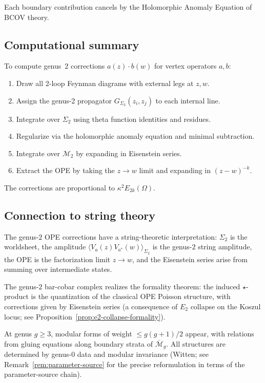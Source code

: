 Each boundary contribution cancels by the Holomorphic Anomaly Equation of BCOV theory.

\subsection{Computational summary}

To compute genus~$2$ corrections $a(z) \cdot b(w)$ for vertex operators $a, b$:
\begin{enumerate}
\item Draw all 2-loop Feynman diagrams with external legs at $z, w$.
\item Assign the genus-2 propagator $G_{\Sigma_2}(z_i, z_j)$ to each internal line.
\item Integrate over $\Sigma_2$ using theta function identities and residues.
\item Regularize via the holomorphic anomaly equation and minimal subtraction.
\item Integrate over $\mathcal{M}_2$ by expanding in Eisenstein series.
\item Extract the OPE by taking the $z \to w$ limit and expanding in $(z-w)^{-k}$.
\end{enumerate}
The corrections are proportional to $\kappa^2 E_{2k}(\Omega)$.

\subsection{Connection to string theory}

The genus-$2$ OPE corrections have a string-theoretic interpretation: $\Sigma_2$ is the worldsheet, the amplitude $\langle V_a(z) V_{a^*}(w) \rangle_{\Sigma_2}$ is the genus-$2$ string amplitude, the OPE is the factorization limit $z \to w$, and the Eisenstein series arise from summing over intermediate states.

\begin{remark}[Formality]
The genus-$2$ bar-cobar complex realizes the formality theorem: the induced $\star$-product is the quantization of the classical OPE Poisson structure, with corrections given by Eisenstein series
(a consequence of $E_2$ collapse on the Koszul locus; see Proposition~\ref{prop:e2-collapse-formality}).
\end{remark}

\begin{remark}
At genus $g \geq 3$, modular forms of weight $\leq g(g+1)/2$ appear, with relations from gluing equations along boundary strata of $\overline{\mathcal{M}}_g$.  All structures are determined by genus-$0$ data and modular invariance (Witten; see Remark~\ref{rem:parameter-source} for the precise reformulation in terms of the parameter-source chain).
\end{remark}


